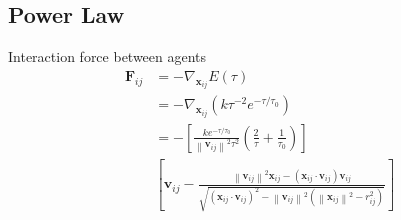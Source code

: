\subsection{Power Law}
Interaction force between agents
\begin{align}
\mathbf{F}_{ij} &= -\nabla_{\mathbf{x}_{ij}} E(\tau) \\
&= -\nabla_{\mathbf{x}_{ij}} \left(k \tau^{-2} e^{-\tau / \tau_{0}} \right)
\\
&= - \left[\frac{k e^{-\tau / \tau_{0}}}{\left\|\mathbf{v}_{ij}\right\|^{2} \tau^{2}} \left(\frac{2}{\tau} + \frac{1}{\tau_{0}}\right) \right] 
\\
&\left[ \mathbf{v}_{ij} - \frac{\left\|\mathbf{v}_{ij}\right\|^{2} \mathbf{x}_{ij} - \left(\mathbf{x}_{ij}\cdot\mathbf{v}_{ij}\right) \mathbf{v}_{ij} }{\sqrt{\left(\mathbf{x}_{ij}\cdot\mathbf{v}_{ij}\right)^{2} - \left\|\mathbf{v}_{ij}\right\|^{2} \left( \left\|\mathbf{x}_{ij}\right\|^{2} - r_{ij}^{2} \right) }} \right]
\end{align}
